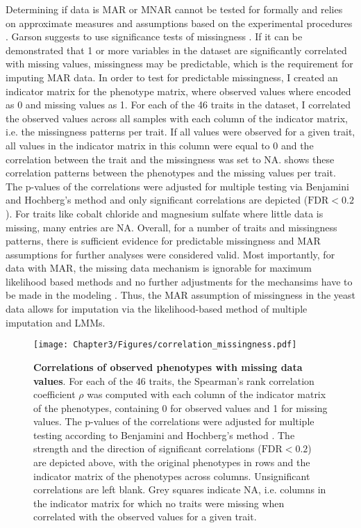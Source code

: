 Determining if data is MAR or MNAR cannot be tested for formally and relies on approximate measures and assumptions based on the experimental procedures \citep{SchaferGraham2002,Garson2015,Templ2012}. Garson suggests to use significance tests of missingness \citeyear{Garson2015}. If it can be demonstrated that \num{1} or more variables in the dataset are significantly correlated with missing values, missingness may be predictable, which is the requirement for imputing MAR data. In order to test for predictable missingness, I created an indicator matrix for the phenotype matrix, where observed values where encoded as \num{0} and missing values as \num{1}. For each of the \num{46} traits in the dataset, I correlated the observed values across all samples with each column of the indicator matrix, i.e. the missingness patterns per trait. If all values were observed for a given trait, all values in the indicator matrix in this column were equal to \num{0} and the correlation between the trait and the missingness was set to NA.  shows these correlation patterns between the phenotypes and the missing values per trait. The p-values of the correlations were adjusted for multiple testing via Benjamini and Hochberg's method \citep{Benjamini1995} and only significant correlations are depicted (\(\text{FDR} < 0.2\)).  For traits like cobalt chloride and magnesium sulfate where little data is missing, many entries are NA. Overall, for a number of traits and missingness patterns, there is sufficient evidence for predictable missingness and MAR assumptions for further analyses were considered valid. Most importantly, for data with MAR, the missing data mechanism is ignorable for maximum likelihood based methods and no further adjustments for the mechansims have to be made in the modeling \citep{Rubin1976,Little1988}. Thus, the MAR assumption of missingness in the yeast data allows for imputation via the likelihood-based method of multiple imputation and LMMs.


\begin{figure}[hbtp]
	\centering
	\texttt{[image: Chapter3/Figures/correlation\_missingness.pdf]}
	\caption[\textbf{Correlations of observed phenotypes with missing data values.} Generated via R function \textit{corrplot::corrplot}]{\textbf{Correlations of observed phenotypes with missing data values}. For each of the \num{46} traits, the Spearman's rank correlation coefficient \(\rho\) was computed with each column of the indicator matrix of the phenotypes, containing 0 for observed values and 1 for missing values. The p-values of the correlations were adjusted for multiple testing according to Benjamini and Hochberg's method \citep{Benjamini1995}. The strength and the direction of significant correlations (\(\text{FDR} < 0.2\)) are depicted above, with the original phenotypes in rows and the indicator matrix of the phenotypes across columns. Unsignificant correlations are left blank. Grey squares indicate NA, i.e. columns in the indicator matrix for which no traits were missing when correlated with the observed values for a given trait. }
 	\label{fig:missingnesscorrelations}
\end{figure}

